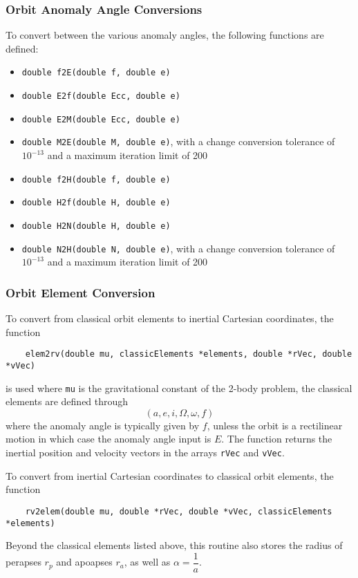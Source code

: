 \subsubsection{Orbit Anomaly Angle Conversions}
To convert between the various anomaly angles, the following functions are defined:
\begin{itemize}
	\item {\tt double f2E(double f, double e)}
	\item {\tt double E2f(double Ecc, double e)}
	\item {\tt double E2M(double Ecc, double e)}
	\item {\tt double M2E(double M, double e)}, with a change conversion tolerance of $10^{-13}$ and a maximum iteration limit of 200
	\item {\tt double f2H(double f, double e)}
	\item {\tt double H2f(double H, double e)}
	\item {\tt double H2N(double H, double e)}
	\item {\tt double N2H(double N, double e)}, with a change conversion tolerance of $10^{-13}$ and a maximum iteration limit of 200
\end{itemize}



\subsubsection{Orbit Element Conversion}
To convert from classical orbit elements to inertial Cartesian coordinates, the function
\begin{verbatim}
	elem2rv(double mu, classicElements *elements, double *rVec, double *vVec)
\end{verbatim}
is used where {\tt mu} is the gravitational constant of the 2-body problem, the classical elements are defined through 
$$
	(a, e, i, \Omega, \omega, f)
$$
where the anomaly angle is typically given by $f$, unless the orbit is a rectilinear motion in which case the anomaly angle input is $E$.  The function returns the inertial position and velocity vectors in the arrays {\tt rVec} and {\tt vVec}.  

To convert from  inertial Cartesian coordinates to classical orbit elements, the function
\begin{verbatim}
	rv2elem(double mu, double *rVec, double *vVec, classicElements *elements)
\end{verbatim}
Beyond the classical elements listed above, this routine also stores the radius of perapses $r_{p}$ and apoapses $r_{a}$, as well as $\alpha = \dfrac{1}{a}$.  


